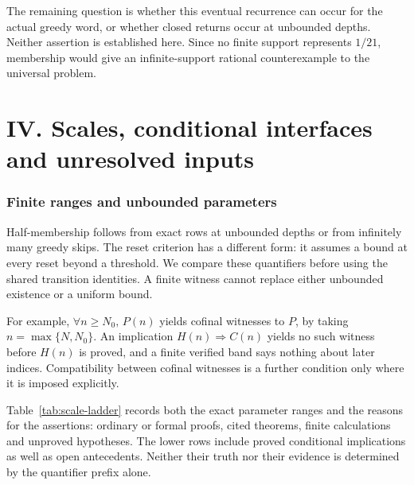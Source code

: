 \documentclass[11pt]{article}
\theoremstyle{plain}
\theoremstyle{definition}
\theoremstyle{remark}
\begin{document}
The remaining question is whether this eventual recurrence can occur
for the actual greedy word, or whether closed returns occur at
unbounded depths. Neither assertion is established here. Since no
finite support represents $1/21$, membership would give an
infinite-support rational counterexample to the universal problem.

\clearpage
\part*{IV. Scales, conditional interfaces and unresolved inputs}
\section{Finite ranges and unbounded parameters}
\label{sec:scale-ladder}
Half-membership follows from exact rows at unbounded depths or from
infinitely many greedy skips. The reset criterion has a different form:
it assumes a bound at every reset beyond a threshold. We compare these
quantifiers before using the shared transition identities. A finite
witness cannot replace either unbounded existence or a uniform bound.

For example, $\forall n\ge N_0,\,P(n)$ yields cofinal witnesses to
$P$, by taking $n=\max\{N,N_0\}$. An implication
$H(n)\Rightarrow C(n)$ yields no such witness before $H(n)$ is proved,
and a finite verified band says nothing about later indices.
Compatibility between cofinal witnesses is a further condition only
where it is imposed explicitly.

Table~\ref{tab:scale-ladder} records both the exact parameter ranges and
the reasons for the assertions: ordinary or formal proofs, cited
theorems, finite calculations and unproved hypotheses. The lower rows
include proved conditional implications as well as open antecedents.
Neither their truth nor their evidence is determined by the quantifier
prefix alone.
\end{document}
